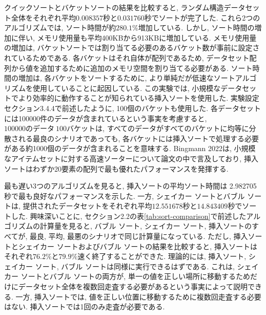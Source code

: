 \documentclass[a4j, 11pt]{jarticle}
\begin{document}
クイックソートとバケットソートの結果を比較すると, ランダム構造データセット全体をそれぞれ平均$0.008357$秒と$0.031760$秒でソートが完了した. これら2つのアルゴリズムでは, ソート時間が約$280.1\%$増加している. しかし, ソート時間の増加に伴い, メモリ使用量も平均400KBから913KBに増加している. メモリ使用量の増加は, バケットソートでは割り当てる必要のあるバケット数が事前に設定されているためである. 各バケットはそれ自体が配列であるため, データセット配列から値を追加するために追加のメモリ空間を割り当てる必要がある. ソート時間の増加は, 各バケットをソートするために, より単純だが低速なソートアルゴリズムを使用していることに起因している. この実験では, 小規模なデータセットでより効率的に動作することが知られている挿入ソートを使用した\cite{bingmann2020faster}. 実験設定セクション3.4.4で前述したように, 100個のバケットも使用した. 各データセットには100000件のデータが含まれているという事実を考慮すると, $100000のデータ \ 100バケット$は, すべてのデータがすべてのバケットに均等に分散される最良のシナリオであっても, 各バケットには挿入ソートで処理する必要がある約1000個のデータが含まれることを意味する. Bingmann 2022は, 小規模なアイテムセットに対する高速ソーターについて論文の中で言及しており, 挿入ソートはわずか20要素の配列で最も優れたパフォーマンスを発揮する. \

最も遅い3つのアルゴリズムを見ると, 挿入ソートの平均ソート時間は 2.982705 秒で最も良好なパフォーマンスを示した. 一方, シェイカー ソートとバブル ソートは, 提供されたデータセットをそれぞれ平均$12.551678$秒と$14.843409$秒でソートした. 興味深いことに, セクション2.2の表\ref{tab:sort-comparison}で前述したアルゴリズムの計算量を見ると, バブル ソート, シェイカー ソート, 挿入ソートのすべてが, 最良, 平均, 最悪のシナリオで同じ計算量になっている. ただし, 挿入ソートとシェイカー ソートおよびバブル ソートの結果を比較すると, 挿入ソートはそれぞれ$76.2\%$と$79.9\%$速く終了することができた. 理論的には, 挿入ソート, シェイカー ソート, バブル ソートは同様に実行できるはずである. これは, シェイカー ソートとバブル ソートの両方が, 単一の値を正しい場所に移動するためだけにデータセット全体を複数回走査する必要があるという事実によって説明できる. 一方, 挿入ソートでは, 値を正しい位置に移動するために複数回走査する必要はない. 挿入ソートでは1回のみ走査が必要である. \
\end{document}
